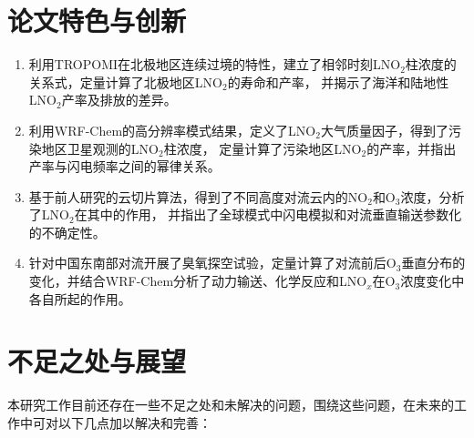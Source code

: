 \section{论文特色与创新}

\begin{enumerate}[label=（\arabic*）, labelindent=\parindent, leftmargin=0pt, widest=0, itemindent=*, topsep=0pt, partopsep=0pt, parsep=0pt]

\item 利用TROPOMI在北极地区连续过境的特性，建立了相邻时刻LNO$_2$柱浓度的关系式，定量计算了北极地区LNO$_2$的寿命和产率，
并揭示了海洋和陆地性LNO$_2$产率及排放的差异。

\item 利用WRF-Chem的高分辨率模式结果，定义了LNO$_2$大气质量因子，得到了污染地区卫星观测的LNO$_2$柱浓度，
定量计算了污染地区LNO$_2$的产率，并指出产率与闪电频率之间的幂律关系。

\item 基于前人研究的云切片算法，得到了不同高度对流云内的NO$_2$和O$_3$浓度，分析了LNO$_2$在其中的作用，
并指出了全球模式中闪电模拟和对流垂直输送参数化的不确定性。

\item 针对中国东南部对流开展了臭氧探空试验，定量计算了对流前后O$_3$垂直分布的变化，并结合WRF-Chem分析了动力输送、化学反应和LNO$_x$在O$_3$浓度变化中各自所起的作用。

\end{enumerate}



\section{不足之处与展望}

本研究工作目前还存在一些不足之处和未解决的问题，围绕这些问题，在未来的工作中可对以下几点加以解决和完善：

